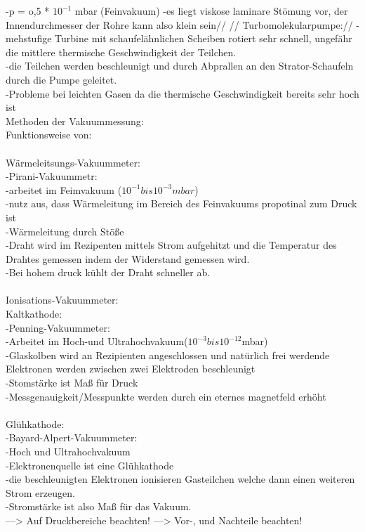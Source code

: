			-p = o,5 * $10^{-1}$ mbar (Feinvakuum)
			-es liegt viskose laminare Stömung vor, der Innendurchmesser der Rohre kann also klein sein//
			//
		Turbomolekularpumpe://
			-mehstufige Turbine mit schaufelähnlichen Scheiben rotiert sehr schnell, ungefähr die mittlere thermische Geschwindigkeit der Teilchen.\\
			-die Teilchen werden beschleunigt und durch Abprallen an den Strator-Schaufeln durch die Pumpe geleitet.\\
			-Probleme bei leichten Gasen da die thermische Geschwindigkeit bereits sehr hoch ist\\

	   Methoden der Vakuummessung:\\
	   	Funktionsweise von:\\
\\
		Wärmeleitsungs-Vakuummeter:\\
			-Pirani-Vakuummetr:\\
				-arbeitet im Feimvakuum ($10^{-1} bis 10^{-3}mbar$)\\
				-nutz aus, dass Wärmeleitung im Bereich des Feinvakuums propotinal zum Druck ist\\
				-Wärmeleitung durch Stöße\\
				-Draht wird im Rezipenten mittels Strom aufgehitzt und die Temperatur des Drahtes gemessen indem der Widerstand gemessen wird.\\
				-Bei hohem druck kühlt der Draht schneller ab.\\
				\\
		Ionisations-Vakuummeter:\\
			Kaltkathode:\\
				-Penning-Vakuummeter:\\
					-Arbeitet im Hoch-und Ultrahochvakuum($10^{-3} bis 10^{-12}$mbar)\\
					-Glaskolben wird an Rezipienten angeschlossen und natürlich frei werdende Elektronen werden zwischen zwei Elektroden beschleunigt\\
					-Stomstärke ist Maß für Druck\\
					-Messgenauigkeit/Messpunkte werden durch ein eternes magnetfeld erhöht\\
					\\
			Glühkathode:\\
				-Bayard-Alpert-Vakuummeter:\\
					-Hoch und Ultrahochvakuum\\
					-Elektronenquelle ist eine Glühkathode\\
					-die beschleunigten Elektronen ionisieren Gasteilchen welche dann einen weiteren Strom erzeugen.\\
					-Stromstärke ist also Maß für das Vakuum.\\


	---> Auf Druckbereiche beachten!
	---> Vor-, und Nachteile beachten!


